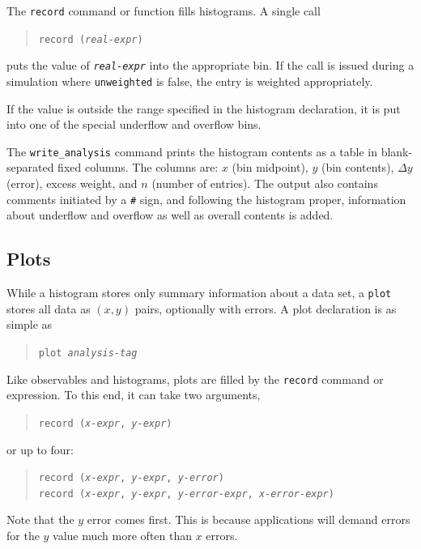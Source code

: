 \documentclass[12pt]{book}
\newcommand{\ttt}[1]{\texttt{#1}}
\begin{document}
The \ttt{record} command or function fills histograms.  A single call
\begin{quote}
  \begin{footnotesize}
\ttt{record (\emph{real-expr})}
  \end{footnotesize}
\end{quote}
puts the value of \ttt{\emph{real-expr}} into the appropriate bin.  If
the call is issued during a simulation where \ttt{unweighted} is false, the
entry is weighted appropriately.

If the value is outside the range specified in the histogram declaration, it
is put into one of the special underflow and overflow bins.

The \ttt{write\_analysis} command prints the histogram contents as a table in
blank-separated fixed columns.  The columns are: $x$ (bin midpoint), $y$ (bin
contents), $\Delta y$ (error), excess weight, and $n$ (number of entries).
The output also contains comments initiated by a \verb|#| sign, and following
the histogram proper, information about underflow and overflow as well as
overall contents is added.


\subsection{Plots}
\label{sec:plot}

While a histogram stores only summary information about a data set, a
\ttt{plot} stores all data as $(x,y)$ pairs, optionally with errors.  A plot
declaration is as simple as
\begin{quote}
  \begin{footnotesize}
\ttt{plot \emph{analysis-tag}}
  \end{footnotesize}
\end{quote}
Like observables and histograms, plots are filled by the \ttt{record} command
or expression.  To this end, it can take two arguments,
\begin{quote}
  \begin{footnotesize}
\ttt{record (\emph{x-expr}, \emph{y-expr})}
  \end{footnotesize}
\end{quote}
or up to four:
\begin{quote}
  \begin{footnotesize}
\ttt{record (\emph{x-expr}, \emph{y-expr}, \emph{y-error})}
\\
\ttt{record (\emph{x-expr}, \emph{y-expr},
  \emph{y-error-expr}, \emph{x-error-expr})}
  \end{footnotesize}
\end{quote}
Note that the $y$ error comes first.  This is because applications will
demand errors for the $y$ value much more often than $x$ errors.
\end{document}
